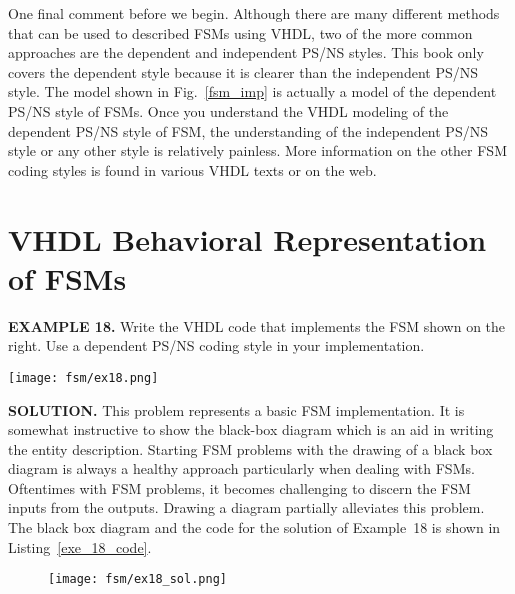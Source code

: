 One final comment before we begin. Although there are many different methods that can be used to described FSMs using VHDL, two of the more common approaches are the dependent and independent PS/NS styles. This book only covers the dependent style because it is clearer than the independent PS/NS style. The model shown in Fig.~\ref{fsm_imp} is actually a model of the dependent PS/NS style of FSMs. Once you understand the VHDL modeling of the dependent PS/NS style of FSM, the understanding of the independent PS/NS style or any other style is relatively painless. More information on the other FSM coding styles is found in various VHDL texts or on the web.

\section{VHDL Behavioral Representation of FSMs}

\begin{leftbar}
\begin{minipage}[t]{0.5\textwidth}
\vspace{10pt}
\noindent
\textbf{EXAMPLE 18.}
Write the VHDL code that implements the FSM shown on the right. Use a dependent PS/NS coding style in your implementation.
\end{minipage}
\begin{minipage}[t]{0.47\textwidth}
\vspace{0pt}\raggedright
    \centering
	\texttt{[image: fsm/ex18.png]}
\end{minipage}
\end{leftbar}
\noindent
\textbf{SOLUTION.} This problem represents a basic FSM implementation. It is somewhat instructive to show the black-box diagram which is an aid in writing the entity description. Starting FSM problems with the drawing of a black box diagram is always a healthy approach particularly when dealing with FSMs. Oftentimes with FSM problems, it becomes challenging to discern the FSM inputs from the outputs. Drawing a diagram partially alleviates this problem. The black box diagram and the code for the solution of Example~18 is shown in Listing~\ref{exe_18_code}.

\begin{figure}[!h]
    \centering
	\texttt{[image: fsm/ex18\_sol.png]}
\end{figure}

